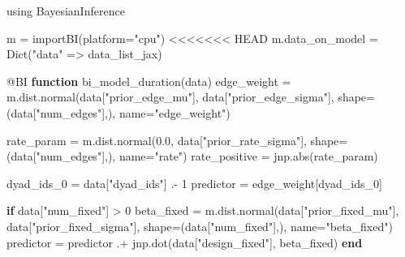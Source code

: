 \documentclass[
  letterpaper,
  DIV=11,
  numbers=noendperiod]{scrartcl}
\newenvironment{Shaded}{\begin{snugshade}}{\end{snugshade}}
\newcommand{\BuiltInTok}[1]{\textcolor[rgb]{0.00,0.23,0.31}{#1}}
\newcommand{\ControlFlowTok}[1]{\textcolor[rgb]{0.00,0.23,0.31}{\textbf{#1}}}
\newcommand{\FloatTok}[1]{\textcolor[rgb]{0.68,0.00,0.00}{#1}}
\newcommand{\FunctionTok}[1]{\textcolor[rgb]{0.28,0.35,0.67}{#1}}
\newcommand{\ImportTok}[1]{\textcolor[rgb]{0.00,0.46,0.62}{#1}}
\newcommand{\KeywordTok}[1]{\textcolor[rgb]{0.00,0.23,0.31}{\textbf{#1}}}
\newcommand{\NormalTok}[1]{\textcolor[rgb]{0.00,0.23,0.31}{#1}}
\newcommand{\OperatorTok}[1]{\textcolor[rgb]{0.37,0.37,0.37}{#1}}
\newcommand{\PreprocessorTok}[1]{\textcolor[rgb]{0.68,0.00,0.00}{#1}}
\newcommand{\StringTok}[1]{\textcolor[rgb]{0.13,0.47,0.30}{#1}}
\begin{document}
\begin{Shaded}
\begin{Highlighting}[]
\ImportTok{using} \BuiltInTok{BayesianInference}

\NormalTok{m }\OperatorTok{=} \FunctionTok{importBI}\NormalTok{(platform}\OperatorTok{=}\StringTok{"cpu"}\NormalTok{)}
\OperatorTok{\textless{}\textless{}\textless{}\textless{}\textless{}\textless{}\textless{}}\NormalTok{ HEAD}
\NormalTok{m.data\_on\_model }\OperatorTok{=} \FunctionTok{Dict}\NormalTok{(}\StringTok{"data"} \OperatorTok{=\textgreater{}}\NormalTok{ data\_list\_jax)}

\PreprocessorTok{@BI} \KeywordTok{function} \FunctionTok{bi\_model\_duration}\NormalTok{(data)}
\NormalTok{    edge\_weight }\OperatorTok{=}\NormalTok{ m.dist.}\FunctionTok{normal}\NormalTok{(data[}\StringTok{"prior\_edge\_mu"}\NormalTok{], data[}\StringTok{"prior\_edge\_sigma"}\NormalTok{], }
\NormalTok{                                shape}\OperatorTok{=}\NormalTok{(data[}\StringTok{"num\_edges"}\NormalTok{],), name}\OperatorTok{=}\StringTok{"edge\_weight"}\NormalTok{)}
    
\NormalTok{    rate\_param }\OperatorTok{=}\NormalTok{ m.dist.}\FunctionTok{normal}\NormalTok{(}\FloatTok{0.0}\NormalTok{, data[}\StringTok{"prior\_rate\_sigma"}\NormalTok{], }
\NormalTok{                               shape}\OperatorTok{=}\NormalTok{(data[}\StringTok{"num\_edges"}\NormalTok{],), name}\OperatorTok{=}\StringTok{"rate"}\NormalTok{)}
\NormalTok{    rate\_positive }\OperatorTok{=}\NormalTok{ jnp.}\FunctionTok{abs}\NormalTok{(rate\_param)}
    
\NormalTok{    dyad\_ids\_0 }\OperatorTok{=}\NormalTok{ data[}\StringTok{"dyad\_ids"}\NormalTok{] }\OperatorTok{.{-}} \FloatTok{1}
\NormalTok{    predictor }\OperatorTok{=}\NormalTok{ edge\_weight[dyad\_ids\_0]}
    
    \ControlFlowTok{if}\NormalTok{ data[}\StringTok{"num\_fixed"}\NormalTok{] }\OperatorTok{\textgreater{}} \FloatTok{0}
\NormalTok{        beta\_fixed }\OperatorTok{=}\NormalTok{ m.dist.}\FunctionTok{normal}\NormalTok{(data[}\StringTok{"prior\_fixed\_mu"}\NormalTok{], data[}\StringTok{"prior\_fixed\_sigma"}\NormalTok{], }
\NormalTok{                                   shape}\OperatorTok{=}\NormalTok{(data[}\StringTok{"num\_fixed"}\NormalTok{],), name}\OperatorTok{=}\StringTok{"beta\_fixed"}\NormalTok{)}
\NormalTok{        predictor }\OperatorTok{=}\NormalTok{ predictor }\OperatorTok{.+}\NormalTok{ jnp.}\FunctionTok{dot}\NormalTok{(data[}\StringTok{"design\_fixed"}\NormalTok{], beta\_fixed)}
    \ControlFlowTok{end}


\end{Highlighting}
\end{Shaded}
\end{document}
